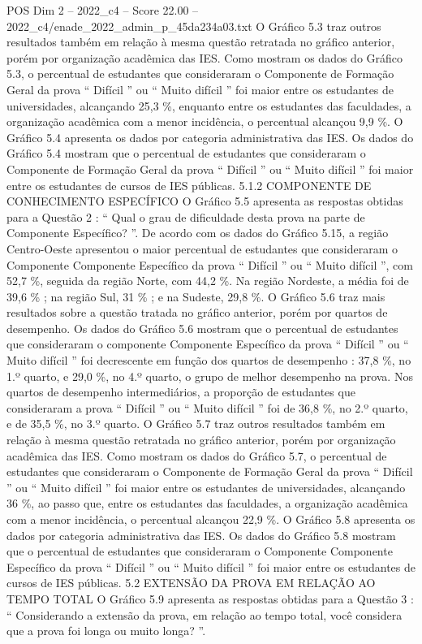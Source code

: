 \begin{textsample}{POS Dim 2 – 2022\_c4 – Score 22.00 – 2022\_c4/enade\_2022\_admin\_p\_45da234a03.txt}
O Gráfico 5.3 traz outros resultados também em relação à mesma questão retratada no gráfico anterior, porém por organização acadêmica das IES.
Como mostram os dados do Gráfico 5.3, o percentual de estudantes que consideraram o Componente de Formação Geral da prova “ Difícil ” ou “ Muito difícil ” foi maior entre os estudantes de universidades, alcançando 25,3 \%, enquanto entre os estudantes das faculdades, a organização acadêmica com a menor incidência, o percentual alcançou 9,9 \%.
O Gráfico 5.4 apresenta os dados por categoria administrativa das IES.
Os dados do Gráfico 5.4 mostram que o percentual de estudantes que consideraram o Componente de Formação Geral da prova “ Difícil ” ou “ Muito difícil ” foi maior entre os estudantes de cursos de IES públicas. 5.1.2 COMPONENTE DE CONHECIMENTO ESPECÍFICO O Gráfico 5.5 apresenta as respostas obtidas para a Questão 2 : “ Qual o grau de dificuldade desta prova na parte de Componente Específico? ”.
De acordo com os dados do Gráfico 5.15, a região Centro-Oeste apresentou o maior percentual de estudantes que consideraram o Componente Componente Específico da prova “ Difícil ” ou “ Muito difícil ”, com 52,7 \%, seguida da região Norte, com 44,2 \%.
Na região Nordeste, a média foi de 39,6 \% ; na região Sul, 31 \% ; e na Sudeste, 29,8 \%.
O Gráfico 5.6 traz mais resultados sobre a questão tratada no gráfico anterior, porém por quartos de desempenho.
Os dados do Gráfico 5.6 mostram que o percentual de estudantes que consideraram o componente Componente Específico da prova “ Difícil ” ou “ Muito difícil ” foi decrescente em função dos quartos de desempenho : 37,8 \%, no 1.º quarto, e 29,0 \%, no 4.º quarto, o grupo de melhor desempenho na prova.
Nos quartos de desempenho intermediários, a proporção de estudantes que consideraram a prova “ Difícil ” ou “ Muito difícil ” foi de 36,8 \%, no 2.º quarto, e de 35,5 \%, no 3.º quarto.
O Gráfico 5.7 traz outros resultados também em relação à mesma questão retratada no gráfico anterior, porém por organização acadêmica das IES.
Como mostram os dados do Gráfico 5.7, o percentual de estudantes que consideraram o Componente de Formação Geral da prova “ Difícil ” ou “ Muito difícil ” foi maior entre os estudantes de universidades, alcançando 36 \%, ao passo que, entre os estudantes das faculdades, a organização acadêmica com a menor incidência, o percentual alcançou 22,9 \%.
O Gráfico 5.8 apresenta os dados por categoria administrativa das IES.
Os dados do Gráfico 5.8 mostram que o percentual de estudantes que consideraram o Componente Componente Específico da prova “ Difícil ” ou “ Muito difícil ” foi maior entre os estudantes de cursos de IES públicas. 5.2 EXTENSÃO DA PROVA EM RELAÇÃO AO TEMPO TOTAL O Gráfico 5.9 apresenta as respostas obtidas para a Questão 3 : “ Considerando a extensão da prova, em relação ao tempo total, você considera que a prova foi longa ou muito longa? ”.

\end{textsample}
